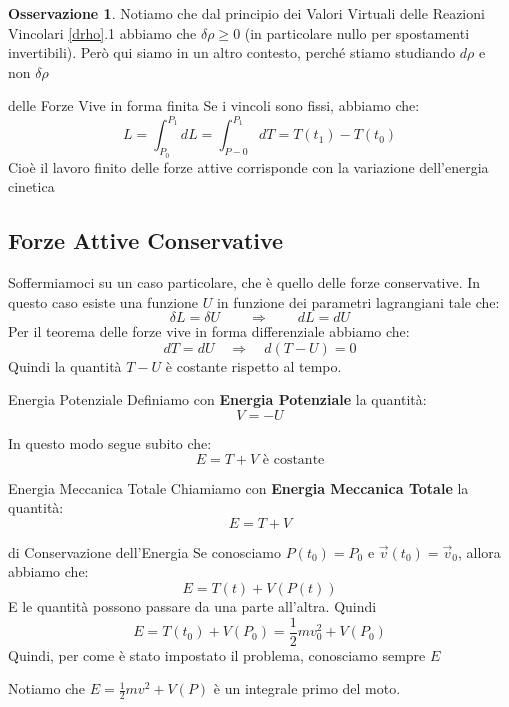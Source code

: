 \documentclass[11pt,a4paper,twoside]{article}
\theoremstyle{definition}
\newtheorem*{oss}{Osservazione}
\begin{document}
\begin{oss}
	Notiamo che dal principio dei Valori Virtuali delle Reazioni Vincolari \ref{drho}.1 abbiamo che $\delta \rho\geq 0$ (in particolare nullo per spostamenti invertibili). Però qui siamo in un altro contesto, perché stiamo studiando $d\rho$ e non $\delta \rho$
\end{oss}

\begin{thm}{delle Forze Vive in forma finita}{}
	Se i vincoli sono fissi, abbiamo che:
	\[ L = \int_{P_0}^{P_1} dL = \int_{P-0}^{P_1} dT = T(t_1) - T(t_0) \]
	Cioè il lavoro finito delle forze attive corrisponde con la variazione dell'energia cinetica
\end{thm}

\subsection{Forze Attive Conservative}

Soffermiamoci su un caso particolare, che è quello delle forze conservative. In questo caso esiste una funzione $U$ in funzione dei parametri lagrangiani tale che:
\[ \delta L = \delta U \qquad \Rightarrow \qquad dL = dU \]
Per il teorema delle forze vive in forma differenziale abbiamo che:
\[ dT = dU \quad \Rightarrow \quad d(T-U) = 0\]
Quindi la quantità $T-U$ è costante rispetto al tempo.

\begin{defn}{Energia Potenziale}{}\label{V}
	Definiamo con \textbf{Energia Potenziale} la quantità:
	\[ V = - U \]
\end{defn}

In questo modo segue subito che:
\[ E = T+V \text{ è costante}\]

\begin{defn}{Energia Meccanica Totale}{}
	Chiamiamo con \textbf{Energia Meccanica Totale} la quantità:
	\[ E = T+V\]
\end{defn}

\begin{thm}{di Conservazione dell'Energia}{}
	Se conosciamo $P(t_0) = P_0$ e $\vec v(t_0) = \vec v_0$, allora abbiamo che:
	\[ E = T(t) + V(P(t)) \]
	E le quantità possono passare da una parte all'altra. Quindi
	\[ E = T(t_0) + V(P_0) = \frac 12 mv_0^2 + V(P_0 ) \]
	Quindi, per come è stato impostato il problema, conosciamo sempre $E$
\end{thm}

Notiamo che $E = \frac 12 mv^2 + V(P)$ è un integrale primo del moto.
\end{document}
